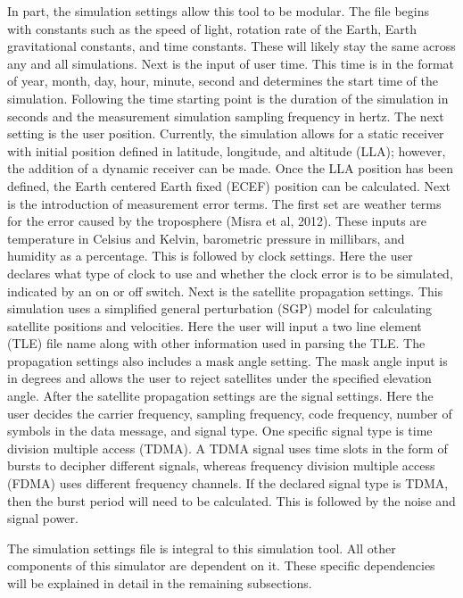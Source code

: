 \documentclass[12pt]{report}
\begin{document}
In part, the simulation settings allow this tool to be modular. The file begins with constants such as the speed of light, rotation rate of the Earth, Earth gravitational constants, and time constants. These will likely stay the same across any and all simulations. Next is the input of user time. This time is in the format of year, month, day, hour, minute, second and determines the start time of the simulation. Following the time starting point is the duration of the simulation in seconds and the measurement simulation sampling frequency in hertz. The next setting is the user position. Currently, the simulation allows for a static receiver with initial position defined in latitude, longitude, and altitude (LLA); however, the addition of a dynamic receiver can be made. Once the LLA position has been defined, the Earth centered Earth fixed (ECEF) position can be calculated. Next is the introduction of measurement error terms. The first set are weather terms for the error caused by the troposphere (Misra et al, 2012). These inputs are temperature in Celsius and Kelvin, barometric pressure in millibars, and humidity as a percentage. This is followed by clock settings. Here the user declares what type of clock to use and whether the clock error is to be simulated, indicated by an on or off switch. Next is the satellite propagation settings. This simulation uses a simplified general perturbation (SGP) model for calculating satellite positions and velocities. Here the user will input a two line element (TLE) file name along with other information used in parsing the TLE. The propagation settings also includes a mask angle setting. The mask angle input is in degrees and allows the user to reject  satellites under the specified elevation angle. After the satellite propagation settings are the signal settings. Here the user decides the carrier frequency, sampling frequency, code frequency, number of symbols in the data message, and signal type. One specific signal type is time division multiple access (TDMA). A TDMA signal uses time slots in the form of bursts to decipher different signals, whereas frequency division multiple access (FDMA) uses different frequency channels. If the declared signal type is TDMA, then the burst period will need to be calculated. This is followed by the noise and signal power.

The simulation settings file is integral to this simulation tool. All other components of this simulator are dependent on it. These specific dependencies will be explained in detail in the remaining subsections.
\end{document}
